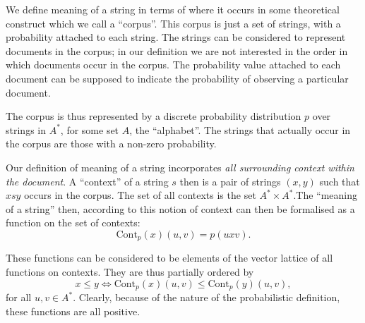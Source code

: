 \documentclass[12pt]{report}
\newcommand{\Cont}{\mathrm{Cont}}
\begin{document}
% 
% 


We define meaning of a string in terms of where it occurs in some theoretical construct which we call a ``corpus''. This corpus is just a set of strings, with a probability attached to each string. The strings can be considered to represent documents in the corpus; in our definition we are not interested in the order in which documents occur in the corpus. The probability value attached to each document can be supposed to indicate the probability of observing a particular document.

The corpus is thus represented by a discrete probability distribution $p$ over strings in $A^*$, for some set $A$, the ``alphabet''. The strings that actually occur in the corpus are those with a non-zero probability.

Our definition of meaning of a string incorporates \emph{all surrounding context within the document}. A ``context'' of a string $s$ then is a pair of strings $(x,y)$ such that $xsy$ occurs in the corpus. The set of all contexts is the set $A^* \times A^*$.The ``meaning of a string'' then, according to this notion of context can then be formalised as a function on the set of contexts:
$$\Cont_p(x)(u,v) = p(uxv).$$

These functions can be considered to be elements of the vector lattice of all functions on contexts. They are thus partially ordered by
$$x \le y \iff \Cont_p(x)(u,v) \le \Cont_p(y)(u,v),$$
for all $u,v \in A^*$. Clearly, because of the nature of the probabilistic definition, these functions are all positive.
\end{document}
